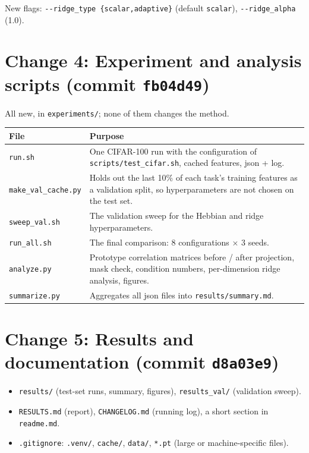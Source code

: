 \documentclass[11pt,a4paper]{article}
\begin{document}
New flags: \texttt{-{}-ridge\_type \{scalar,adaptive\}} (default \texttt{scalar}),
\texttt{-{}-ridge\_alpha} (1.0).

\section{Change 4: Experiment and analysis scripts (commit \texttt{fb04d49})}

All new, in \texttt{experiments/}; none of them changes the method.

\begin{table}[h]
\centering
\begin{tabularx}{\textwidth}{lL}
\toprule
File & Purpose \\
\midrule
\texttt{run.sh} & One CIFAR-100 run with the configuration of \texttt{scripts/test\_cifar.sh}, cached features, json + log. \\
\texttt{make\_val\_cache.py} & Holds out the last 10\% of each task's training features as a validation split, so hyperparameters are not chosen on the test set. \\
\texttt{sweep\_val.sh} & The validation sweep for the Hebbian and ridge hyperparameters. \\
\texttt{run\_all.sh} & The final comparison: 8 configurations $\times$ 3 seeds. \\
\texttt{analyze.py} & Prototype correlation matrices before / after projection, mask check, condition numbers, per-dimension ridge analysis, figures. \\
\texttt{summarize.py} & Aggregates all json files into \texttt{results/summary.md}. \\
\bottomrule
\end{tabularx}
\end{table}

\section{Change 5: Results and documentation (commit \texttt{d8a03e9})}

\begin{itemize}
  \item \texttt{results/} (test-set runs, summary, figures), \texttt{results\_val/} (validation sweep).
  \item \texttt{RESULTS.md} (report), \texttt{CHANGELOG.md} (running log), a short section in \texttt{readme.md}.
  \item \texttt{.gitignore}: \texttt{.venv/}, \texttt{cache/}, \texttt{data/}, \texttt{*.pt} (large or machine-specific files).
\end{itemize}
\end{document}
